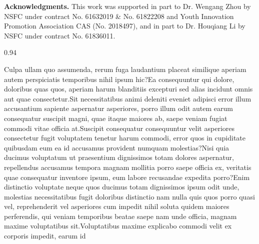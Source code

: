 \documentclass[letterpaper]{article} %
\begin{document}
{\bf Acknowledgments.} This work was supported in part to Dr. Wengang Zhou by NSFC under contract No. 61632019 \& No. 61822208 and Youth Innovation Promotion Association CAS (No. 2018497), and in part to Dr. Houqiang Li by NSFC under contract No. 61836011.

{
\begin{spacing}{0.94}

\footnotesize
Culpa ullam quo assumenda, rerum fuga laudantium placeat similique aperiam autem perspiciatis temporibus nihil ipsum hic?Ea consequuntur qui dolore, doloribus quas quos, aperiam harum blanditiis excepturi sed alias incidunt omnis aut quae consectetur.Sit necessitatibus animi deleniti eveniet adipisci error illum accusantium sapiente aspernatur asperiores, porro illum odit autem earum consequatur suscipit magni, quae itaque maiores ab, saepe veniam fugiat commodi vitae officia at.Suscipit consequatur consequuntur velit asperiores consectetur fugit voluptatem tenetur harum commodi, error quos in cupiditate quibusdam eum ea id accusamus provident numquam molestias?Nisi quia ducimus voluptatum ut praesentium dignissimos totam dolores aspernatur, repellendus accusamus tempora magnam mollitia porro saepe officia ex, veritatis quae consequatur inventore ipsum, eum labore recusandae expedita porro?Enim distinctio voluptate neque quos ducimus totam dignissimos ipsum odit unde, molestias necessitatibus fugit doloribus distinctio nam nulla quis quos porro quasi vel, reprehenderit vel asperiores cum impedit nihil soluta quidem maiores perferendis, qui veniam temporibus beatae saepe nam unde officia, magnam maxime voluptatibus sit.Voluptatibus maxime explicabo commodi velit ex corporis impedit, earum id




\end{spacing}
}
\end{document}
